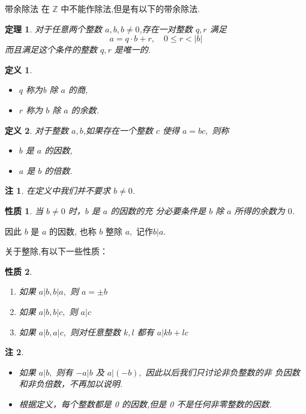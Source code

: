 \documentclass[13pt]{beamer}
\newtheorem{thm}{定理}
\newtheorem*{defi}{定义}
\newtheorem*{rem}{注}
\newtheorem*{prop}{性质}
\begin{document}
\begin{frame}{带余除法}
在 $\mathbb{Z}$ 中不能作除法,但是有以下的\alert{带余除法}.  
\begin{thm}
对于任意两个整数 $a ,b,b\neq 0$,存在一对整数 $q, r$ 满足
\[
a=q \cdot b+r, \quad 0 \leqslant r<|b|
\]
而且满足这个条件的整数 $q, r$ 是唯一的. 
\end{thm}
\begin{defi}
\begin{itemize}
\item $q$ 称为b 除 $a$ 的\alert{商}, 
\item $r$ 称为 $b$ 除 $a$ 的\alert{余数}. 
\end{itemize}
\end{defi}
 
\end{frame}

\begin{frame}
\begin{defi}
	对于整数 $a ,b$,如果存在一个整数 $c$ 使得 $a=b c,$ 则称
\begin{itemize}
\item $b$ 是 $a$ 的\alert{因数}, 
\item $a$ 是 $b$ 的\alert{倍数}.
\end{itemize}
\end{defi}
\begin{rem}
在定义中我们并不要求 $b\neq0$. 
\end{rem}


\end{frame}

\begin{frame}

\begin{prop}
	当 $b\neq 0$ 时，$b$ 是 $a$ 的因数的充 分必要条件是 $b$ 除 $a$ 所得的余数为 $0$.
\end{prop}
因此 $b$ 是 $a$ 的因数, 也称 $b$ \alert{整除} $a,$ 记作$b | a$. 

关于整除,有以下一些性质：
\begin{prop}
\begin{enumerate}
\item 如果 $a|b, b| a,$ 则 $a=\pm b$
\item 如果 $a|b, b| c,$ 则 $a | c$
\item  如果 $a|b, a| c,$ 则对任意整数 $k, l$ 都有 $a | k b+l c$
\end{enumerate}
\end{prop}
\begin{rem}
\begin{itemize}
\item 如果 $a | b,$ 则有 $-a | b$ 及 $a |(-b),$ 因此以后我们只讨论\alert{非负整数}的\alert{非 负因数}和\alert{非负倍数}，不再加以说明.

\item 根据定义，每个整数都是 0 的因数,但是 0 不是任何非零整数的因数.
\end{itemize}
\end{rem}

\end{frame}
\end{document}
